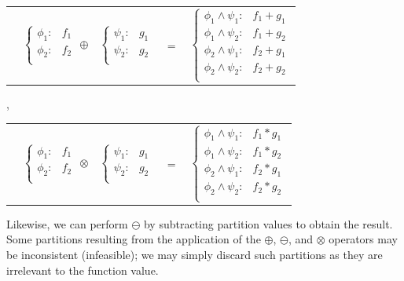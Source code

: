 \documentclass[twoside,11pt]{article}
\begin{document}
{\footnotesize 
\begin{center}
\begin{tabular}{r c c c l}
&
\hspace{-6mm} 
  $\begin{cases}
    \phi_1: & f_1 \\ 
    \phi_2: & f_2 \\ 
  \end{cases}$
$\oplus$
&
\hspace{-4mm}
  $\begin{cases}
    \psi_1: & g_1 \\ 
    \psi_2: & g_2 \\ 
  \end{cases}$
&
\hspace{-2mm} 
$ = $
&
\hspace{-2mm}
  $\begin{cases}
  \phi_1 \wedge \psi_1: & f_1 + g_1 \\ 
  \phi_1 \wedge \psi_2: & f_1 + g_2 \\ 
  \phi_2 \wedge \psi_1: & f_2 + g_1 \\ 
  \phi_2 \wedge \psi_2: & f_2 + g_2 \\ 
  \end{cases}$
\end{tabular}
\vspace{4mm}
\hspace{-2mm}
,
\hspace{-2mm}
\begin{tabular}{r c c c l}
&
\hspace{-6mm} 
  $\begin{cases}
    \phi_1: & f_1 \\ 
    \phi_2: & f_2 \\ 
  \end{cases}$
$\otimes$
&
\hspace{-4mm}
  $\begin{cases}
    \psi_1: & g_1 \\ 
    \psi_2: & g_2 \\ 
  \end{cases}$
&
\hspace{-2mm} 
$ = $
&
\hspace{-2mm}
  $\begin{cases}
  \phi_1 \wedge \psi_1: & f_1 * g_1 \\ 
  \phi_1 \wedge \psi_2: & f_1 * g_2 \\ 
  \phi_2 \wedge \psi_1: & f_2 * g_1 \\ 
  \phi_2 \wedge \psi_2: & f_2 * g_2 \\ 
  \end{cases}$
\end{tabular}
\end{center}
}
\normalsize
Likewise, we can perform $\ominus$ by subtracting partition values to obtain the result.  Some partitions resulting from
the application of the $\oplus$, $\ominus$, and $\otimes$ operators
may be inconsistent (infeasible); we may simply discard such 
partitions as they are irrelevant to the function value.
\end{document}
